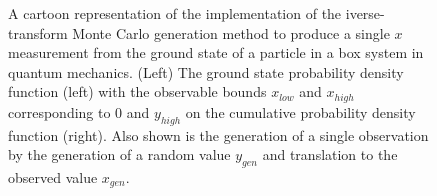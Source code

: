 \documentclass[UKenglish,texlive=2016]{\ATLASLATEXPATH atlasdoc}
\begin{document}
\begin{figure}
\centering
{}
\caption{A cartoon representation of the implementation of the iverse-transform Monte Carlo generation method to produce a single $x$ measurement from the ground state of a particle in a box system in quantum mechanics.  (Left) The ground state probability density function (left) with the observable bounds $x_{low}$ and $x_{high}$ corresponding to 0 and $y_{high}$ on the cumulative probability density function (right).  Also shown is the generation of a single observation by the generation of a random value $y_{gen}$ and translation to the observed value $x_{gen}$.}
\label{fig:particle_in_box_inversetransform}
\end{figure}

\begin{center}
\end{center}
\end{document}

